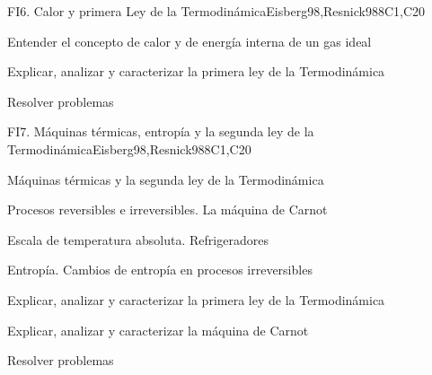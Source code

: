 \begin{syllabus}
\begin{unit}{FI6. Calor y primera Ley de la Termodinámica}{}{Eisberg98,Resnick98}{8}{C1,C20}
   \begin{learningoutcomes}
         \item  Entender el concepto de calor y de energía interna de un gas ideal
         \item  Explicar, analizar y caracterizar la primera ley de la Termodinámica
         \item  Resolver problemas
   \end{learningoutcomes}
\end{unit}

\begin{unit}{FI7. Máquinas térmicas, entropía y la segunda ley de la Termodinámica}{}{Eisberg98,Resnick98}{8}{C1,C20}
\begin{topics}
         \item  Máquinas térmicas y la segunda ley de la Termodinámica
	 \item  Procesos reversibles e irreversibles. La máquina de Carnot
         \item  Escala de temperatura absoluta. Refrigeradores
	 \item  Entropía. Cambios de entropía en procesos irreversibles
   \end{topics}

   \begin{learningoutcomes}
         \item  Explicar, analizar y caracterizar la primera ley de la Termodinámica
         \item  Explicar, analizar y caracterizar la máquina de Carnot
         \item  Resolver problemas
   \end{learningoutcomes}
\end{unit}

\begin{coursebibliography}
\end{coursebibliography}

\end{syllabus}

%
